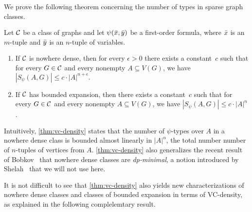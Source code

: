 We prove the following theorem concerning the number of
types in sparse graph classes.

\begin{theorem}\label{thm:vc-density}
Let $\mathcal{C}$ be a class of graphs and let $\psi(\bar{x},\bar{y})$ be a first-order formula, where 
$\bar{x}$ is an $m$-tuple and $\bar{y}$ is an $n$-tuple of variables. 
\begin{enumerate}
\item If $\mathcal{C}$ is nowhere dense, then for every $\epsilon>0$ 
there exists a constant~$c$ such that for every $G\in \mathcal{C}$ and every nonempty
$A\subseteq V(G)$, we have $|S_\psi(A,G)|\leq c\cdot |A|^{n+\epsilon}.$

\item If $\mathcal{C}$ has bounded expansion, then there exists a constant~$c$ such that for every $G\in \mathcal{C}$ and every nonempty $A\subseteq V(G)$, we have $|S_\psi(A,G)|\leq c\cdot |A|^n$.
\end{enumerate}
\end{theorem}

Intuitively, \cref{thm:vc-density} states that the number
of $\psi$-types over $A$ in a nowhere dense class 
is bounded almost linearly in $|A|^n$, the total number number of $n$-tuples of vertices from $A$. 
\cref{thm:vc-density} also generalizes the recent result of Bobkov~\cite{bobkov2017computations} that nowhere dense classes
are {\em{dp-minimal}}, a notion introduced by Shelah~\cite{shelah2014strongly} that we will not use here.



%
%
%
%
%
%
It is not difficult to see that \cref{thm:vc-density} also yields new
characterizations of nowhere dense classes and classes of bounded expansion in terms of VC-density, as explained in the following complelemtary result.

